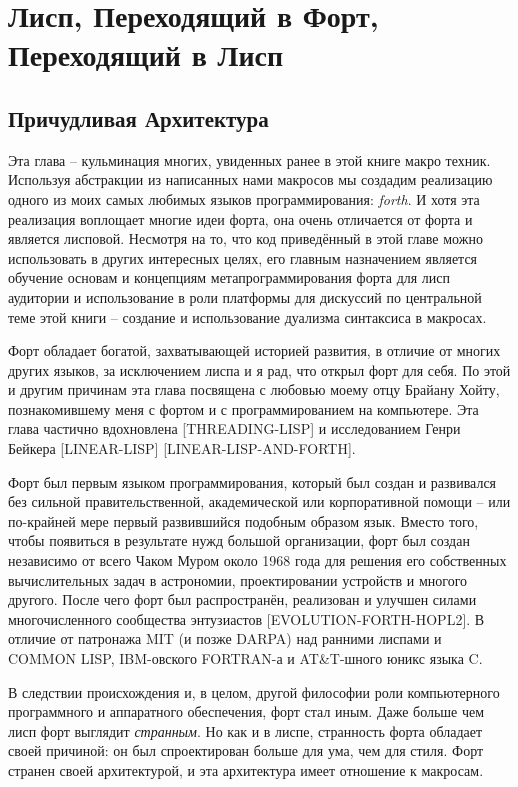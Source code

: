 \chapter[Лисп в Форт, Форт в Лисп]{Лисп, Переходящий в Форт, Переходящий в Лисп}\label{chapter_lisp_forth_lisp}

\section{Причудливая Архитектура}\label{section_wird_design} 

Эта глава -- кульминация многих, увиденных ранее в этой книге макро техник. Используя абстракции из написанных нами макросов мы создадим реализацию одного из моих самых любимых языков программирования: \emph{forth}. И хотя эта реализация воплощает многие идеи форта, она очень отличается от форта и является лисповой. Несмотря на то, что код приведённый в этой главе можно использовать в других интересных целях, его главным назначением является обучение основам и концепциям метапрограммирования форта для лисп аудитории и использование в роли платформы для дискуссий по центральной теме этой книги -- создание и использование дуализма синтаксиса в макросах.

Форт обладает богатой, захватывающей историей развития, в отличие от многих других языков, за исключением лиспа и я рад, что открыл форт для себя. По этой и другим причинам эта глава посвящена с любовью моему отцу Брайану Хойту, познакомившему меня с фортом и с программированием на компьютере. Эта глава частично вдохновлена [THREADING-LISP] и исследованием Генри Бейкера [LINEAR-LISP] [LINEAR-LISP-AND-FORTH].

Форт был первым языком программирования, который был создан и развивался без сильной правительственной, академической или корпоративной помощи -- или по-крайней мере первый развившийся подобным образом язык. Вместо того, чтобы появиться в результате нужд большой организации, форт был создан независимо от всего Чаком Муром около 1968 года для решения его собственных вычислительных задач в астрономии, проектировании устройств и многого другого. После чего форт был распространён, реализован и улучшен силами многочисленного сообщества энтузиастов [EVOLUTION-FORTH-HOPL2]. В отличие от патронажа MIT (и позже DARPA) над ранними лиспами и COMMON LISP, IBM-овского FORTRAN-а и AT\&T-шного юникс языка C.

В следствии происхождения и, в целом, другой философии роли компьютерного программного и аппаратного обеспечения, форт стал иным. Даже больше чем лисп форт выглядит \emph{странным}. Но как и в лиспе, странность форта обладает своей причиной: он был спроектирован больше для ума, чем для стиля. Форт странен своей архитектурой, и эта архитектура имеет отношение к макросам.

